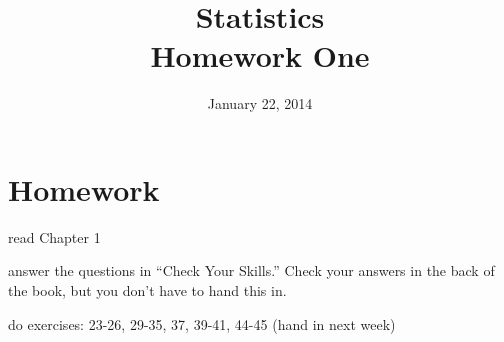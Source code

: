 \documentclass{exam}
\title{Statistics \\ Homework One}
\author{}
\date{January 22, 2014}
\begin{document}
  \maketitle

  \section{Homework}
  \ifprintanswers
  \else
    \begin{itemize*}
      \item read Chapter 1 
      \item answer the questions in ``Check Your Skills.''  Check your answers
        in the back of the book, but you don't have to hand this in.
      \item do exercises: 23-26, 29-35, 37, 39-41, 44-45 (hand in next week)
    \end{itemize*}
  \fi
\end{document}
